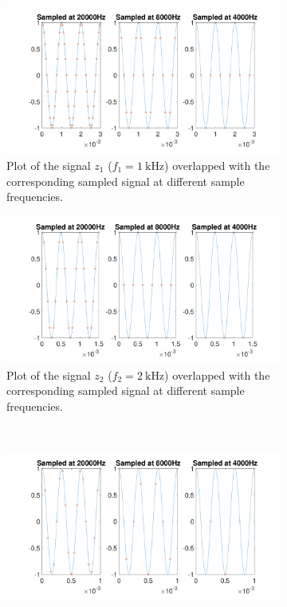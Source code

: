 \documentclass[a4paper, oneside, 11pt]{article}
\begin{document}
\begin{figure}[ht!]
    \centering
     \begin{subfigure}[b]{0.49\textwidth}
         \centering
         \includegraphics[width=\textwidth]{figures/plot_z_1000_Hz.pdf}
         \caption{Plot of the signal $z_1$ ($f_1 = \SI{1}{\kilo \hertz}$) overlapped with the corresponding sampled signal at different sample frequencies.}
         \label{fig:z_1000}
     \end{subfigure}
     \hfill
     \begin{subfigure}[b]{0.49\textwidth}
         \centering
         \includegraphics[width=\textwidth]{figures/plot_z_2000_Hz.pdf}
         \caption{Plot of the signal $z_2$ ($f_2 = \SI{2}{\kilo \hertz}$) overlapped with the corresponding sampled signal at different sample frequencies.}
         \label{fig:z_2000}
     \end{subfigure}
     \\
    \begin{subfigure}[b]{0.49\textwidth}
         \centering
         \includegraphics[width=\textwidth]{figures/plot_z_3000_Hz.pdf}

\end{subfigure}
\end{figure}
\end{document}

